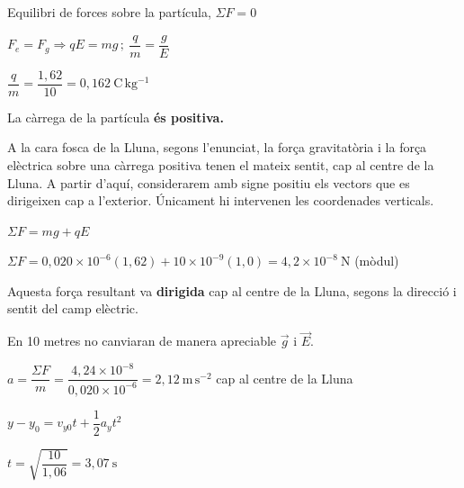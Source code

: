 \begin{solapartat}
 Equilibri de forces sobre la partícula, $\Sigma F = 0$

\smallskip
{} $F_e = F_g \Rightarrow qE = mg\,;\ \dfrac{q}{m} = \dfrac{g}{E}$

\smallskip
{} $\dfrac{q}{m} = \dfrac{1,62}{10} = 0,162\ \mathrm{C\,kg^{-1}}$

\smallskip
{} La càrrega de la partícula \textbf{és positiva.}
\end{solapartat}

\begin{solapartat}
A la cara fosca de la Lluna, segons l'enunciat, la força gravitatòria i la força elèctrica sobre una càrrega positiva tenen el mateix sentit, cap al centre de la Lluna. A partir d'aquí, considerarem amb signe positiu els vectors que es dirigeixen cap a l'exterior. Únicament hi intervenen les coordenades verticals.

\medskip
{} $\Sigma F = mg + qE$

\smallskip
{} $\Sigma F = 0,020\times 10^{-6}(1,62) + 10\times 10^{-9}(1,0) = 4,2\times 10^{-8}\ \mathrm{N}$ (mòdul)

\smallskip
{} Aquesta força resultant va \textbf{dirigida} cap al centre de la Lluna, segons la direcció i sentit del camp elèctric.

En 10 metres no canviaran de manera apreciable $\vec{g}$ i $\vec{E}$.

\smallskip
{} $a = \dfrac{\Sigma F}{m} = \dfrac{4,24\times 10^{-8}}{0,020\times 10^{-6}} = 2,12\ \mathrm{m\,s^{-2}}$ cap al centre de la Lluna

\smallskip
{} $y - y_0 = v_{y0}t + \dfrac{1}{2}a_y t^2$

\smallskip
{} $t = \sqrt{\dfrac{10}{1,06}} = 3,07\ \mathrm{s}$
\end{solapartat}
